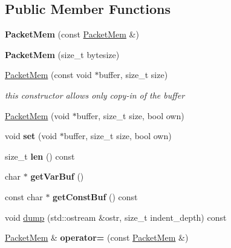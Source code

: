 \subsection*{Public Member Functions}
\begin{DoxyCompactItemize}
\item 
{\bfseries Packet\+Mem} (const \hyperlink{classPacketMem}{Packet\+Mem} \&)\hypertarget{classPacketMem_a0b8e24e43ba95d3ff25799ba1656d879}{}\label{classPacketMem_a0b8e24e43ba95d3ff25799ba1656d879}

\item 
{\bfseries Packet\+Mem} (size\+\_\+t bytesize)\hypertarget{classPacketMem_ac77545b107437575772961df9d5cd7b1}{}\label{classPacketMem_ac77545b107437575772961df9d5cd7b1}

\item 
\hyperlink{classPacketMem_a562c64ebeb8e41e87b365f9fdc21db51}{Packet\+Mem} (const void $\ast$buffer, size\+\_\+t size)\hypertarget{classPacketMem_a562c64ebeb8e41e87b365f9fdc21db51}{}\label{classPacketMem_a562c64ebeb8e41e87b365f9fdc21db51}

\begin{DoxyCompactList}\small\item\em this constructor allows only copy-\/in of the buffer \end{DoxyCompactList}\item 
\hyperlink{classPacketMem_a131af5fa1947eca5a399eac3e3270811}{Packet\+Mem} (void $\ast$buffer, size\+\_\+t size, bool own)
\item 
void {\bfseries set} (void $\ast$buffer, size\+\_\+t size, bool own)\hypertarget{classPacketMem_a3d9494e53b9ed9a88fbed59482b491e8}{}\label{classPacketMem_a3d9494e53b9ed9a88fbed59482b491e8}

\item 
size\+\_\+t {\bfseries len} () const \hypertarget{classPacketMem_a97a7acc35c63db3070a6adc99da72c50}{}\label{classPacketMem_a97a7acc35c63db3070a6adc99da72c50}

\item 
char $\ast$ {\bfseries get\+Var\+Buf} ()\hypertarget{classPacketMem_a12426f281f0c2eadf8a1ea2716b06868}{}\label{classPacketMem_a12426f281f0c2eadf8a1ea2716b06868}

\item 
const char $\ast$ {\bfseries get\+Const\+Buf} () const \hypertarget{classPacketMem_aaa5e414eab973099821f0568ba2b3a36}{}\label{classPacketMem_aaa5e414eab973099821f0568ba2b3a36}

\item 
void \hyperlink{classPacketMem_a1588778e59bd93c42a199d717de239c6}{dump} (std\+::ostream \&ostr, size\+\_\+t indent\+\_\+depth) const 
\item 
\hyperlink{classPacketMem}{Packet\+Mem} \& {\bfseries operator=} (const \hyperlink{classPacketMem}{Packet\+Mem} \&)\hypertarget{classPacketMem_a1fbd05c7851abf74f5a9c86c4e5baaaf}{}\label{classPacketMem_a1fbd05c7851abf74f5a9c86c4e5baaaf}


\end{DoxyCompactItemize}
